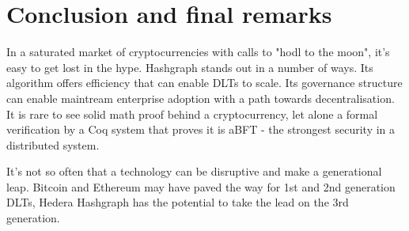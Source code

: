 \section{Conclusion and final remarks}

In a saturated market of cryptocurrencies with calls to "hodl to the moon", it's easy to get lost in the hype. Hashgraph stands out in a number of ways. Its algorithm offers efficiency that can enable DLTs to scale. Its governance structure can enable maintream enterprise adoption with a path towards decentralisation. It is rare to see solid math proof behind a cryptocurrency, let alone a formal verification by a Coq system that proves it is aBFT - the strongest security in a distributed system.

It's not so often that a technology can be disruptive and make a generational leap. Bitcoin and Ethereum may have paved the way for 1st and 2nd generation DLTs, Hedera Hashgraph has the potential to take the lead on the 3rd generation.
